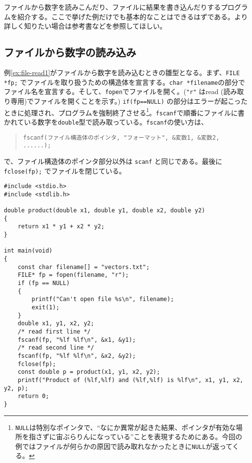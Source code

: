 ファイルから数字を読みこんだり、ファイルに結果を書き込んだりするプログラムを紹介する。ここで挙げた例だけでも基本的なことはできるはずである。より詳しく知りたい場合は参考書などを参照してほしい。

\subsection{ファイルから数字の読み込み}

例\ref{ex:file-read1}がファイルから数字を読み込むときの雛型となる。まず、\texttt{FILE *fp;} でファイルを取り扱うための構造体を宣言する。\texttt{char *filename}の部分でファイル名を宣言する。そして、\texttt{fopen}でファイルを開く。(\texttt{"r"} はread (読み取り専用)でファイルを開くことを示す。) \texttt{if(fp==NULL){}} の部分はエラーが起こったときに処理され、プログラムを強制終了させる\footnote{\texttt{NULL}は特別なポインタで、``なにか異常が起きた結果、ポインタが有効な場所を指さずに宙ぶらりんになっている''ことを表現するためにある。今回の例ではファイルが何らかの原因で読み取れなかったときに\texttt{NULL}が返ってくる。}。\texttt{fscanf}で順番にファイルに書かれている数字を\texttt{double}型で読み取っている。\texttt{fscanf}の使い方は、
\begin{quote}
    \begin{verbatim}
fscanf(ファイル構造体のポインタ, "フォーマット", &変数1, &変数2, ......);
\end{verbatim}
\end{quote}
で、ファイル構造体のポインタ部分以外は \texttt{scanf} と同じである。最後に \texttt{fclose(fp);} でファイルを閉じている。
\begin{reidai}\label{ex:file-read1}
    \begin{verbatim}
#include <stdio.h>
#include <stdlib.h>

double product(double x1, double y1, double x2, double y2)
{
    return x1 * y1 + x2 * y2;
}

int main(void)
{
    const char filename[] = "vectors.txt";
    FILE* fp = fopen(filename, "r");
    if (fp == NULL)
    {
        printf("Can't open file %s\n", filename);
        exit(1);
    }
    double x1, y1, x2, y2;
    /* read first line */
    fscanf(fp, "%lf %lf\n", &x1, &y1);
    /* read second line */
    fscanf(fp, "%lf %lf\n", &x2, &y2);
    fclose(fp);
    const double p = product(x1, y1, x2, y2);
    printf("Product of (%lf,%lf) and (%lf,%lf) is %lf\n", x1, y1, x2, y2, p);
    return 0;
}
\end{verbatim}
\end{reidai} \noindent
